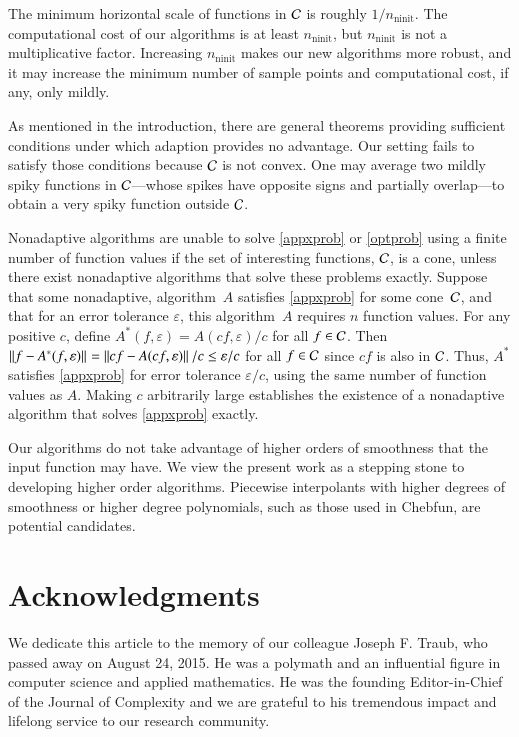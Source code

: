 \documentclass[review]{elsarticle}
\newcommand{\abstol}{\varepsilon}
\theoremstyle{definition}
\DeclareMathOperator{\ninit}{ninit}
\begin{document}
The minimum horizontal scale of functions in $\mathcal{C}$ is roughly $1/n_{\ninit}$. The
computational cost of our algorithms is at least $n_{\ninit}$, but $n_{\ninit}$ is not a
multiplicative factor. Increasing $n_{\ninit}$ makes our new algorithms more robust, and it may
increase the minimum number of sample points and %
computational cost, if any, only mildly.

As mentioned in the introduction, there are general theorems providing sufficient
conditions under which adaption provides
no advantage. Our setting fails to satisfy those conditions because $\mathcal{C}$ is not
convex. One may average two mildly spiky functions in $\mathcal{C}$---whose spikes have
opposite signs and partially overlap---to obtain a very spiky function outside
$\mathcal{C}$.

Nonadaptive algorithms are unable to solve \eqref{appxprob} or
\eqref{optprob} using a finite number of function values if the set of
interesting functions, $\mathcal{C}$, is a cone, unless there exist nonadaptive
algorithms that solve these problems exactly. Suppose that some nonadaptive, 
algorithm~$A$ satisfies \eqref{appxprob} for some cone~$\mathcal{C}$, and that for an error
tolerance $\abstol$, this algorithm~$A$ requires $n$ function values. For any positive 
$c$,
define $A^*(f,\abstol) = A(cf,\abstol)/c$ for all $f \in \mathcal{C}$. Then $\norm{f -
A^*(f,\abstol)} = \norm{cf - A(cf,\abstol)}/c\le \abstol/c$ for all $f \in \mathcal{C}$
since $cf$ is also in $\mathcal{C}$. Thus, $A^*$ satisfies \eqref{appxprob} for error
tolerance $\abstol/c$, using the same number of function values as $A$.
Making $c$ arbitrarily large establishes the existence of a nonadaptive
algorithm that solves \eqref{appxprob} exactly.

Our algorithms do not take advantage of higher orders of
smoothness that the input function may have. We view the present work as a
stepping stone to developing higher order algorithms. Piecewise interpolants
with higher degrees of smoothness or higher degree polynomials, such as those used
in Chebfun, are potential candidates.


\section*{Acknowledgments}

We dedicate this article to the memory of our colleague Joseph F. Traub, who
passed away on August 24, 2015. He was a polymath and an influential figure in
computer science and applied mathematics. He was the founding Editor-in-Chief of
the Journal of Complexity and we are grateful to his tremendous impact and lifelong
service to our research community.
\end{document}
